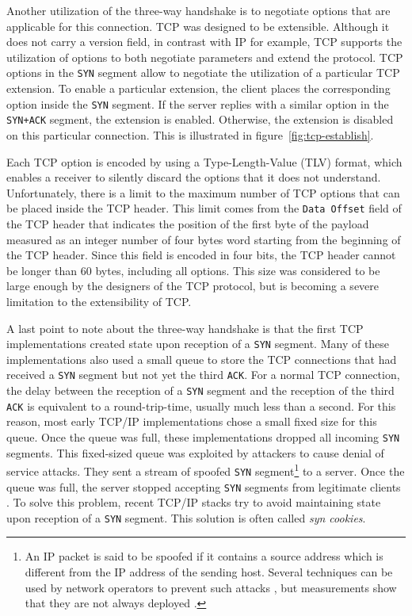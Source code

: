 Another utilization of the three-way handshake is to negotiate options that are applicable for this connection. TCP was designed to be extensible. Although it does not carry a version field, in contrast with IP for example, TCP supports the utilization of options to both negotiate parameters and extend the protocol. 
TCP options in the \texttt{SYN} segment allow to negotiate the utilization of a particular TCP extension. To enable a particular extension, the client places the corresponding option inside the \texttt{SYN} segment. If the server replies with a similar option in the \texttt{SYN+ACK} segment, the extension is enabled. Otherwise, the extension is disabled on this particular connection. This is illustrated in figure~\ref{fig:tcp-establish}.


Each TCP option is encoded by using a Type-Length-Value (TLV) format, which enables a receiver to silently discard the options that it does not understand. Unfortunately, there is a limit to the maximum number of TCP options that can be placed inside the TCP header. This limit comes from the \texttt{Data Offset} field of the TCP header that indicates the position of the first byte of the payload measured as an integer number of four bytes word starting from the beginning of the TCP header. Since this field is encoded in four bits, the TCP header cannot be longer than 60 bytes, including all options. This size was considered to be large enough by the designers of the TCP protocol, but is becoming a severe limitation to the extensibility of TCP. 

A last point to note about the three-way handshake is that the first TCP implementations created state upon reception of a \texttt{SYN} segment. Many of these implementations also used a small queue to store the TCP connections that had received a \texttt{SYN} segment but not yet the third \texttt{ACK}. For a normal TCP connection, the delay between the reception of a \texttt{SYN} segment and the reception of the third \texttt{ACK} is equivalent to a round-trip-time, usually much less than a second. For this reason, most early TCP/IP implementations chose a small fixed size for this queue. Once the queue was full, these implementations dropped all incoming \texttt{SYN} segments. This fixed-sized queue was exploited by attackers to cause denial of service attacks. They sent a stream of spoofed \texttt{SYN} segment\footnote{An IP packet is said to be spoofed if it contains a source address which is different from the IP address of the sending host. Several techniques can be used by network operators to prevent such attacks \cite{rfc2827}, but measurements show that they are not always deployed \cite{Beverly:2009:UED:1644893.1644936}.} to a server. Once the queue was full, the server stopped accepting \texttt{SYN} segments from legitimate clients \cite{rfc4987}. To solve this problem, recent TCP/IP stacks try to avoid maintaining state upon reception of a \texttt{SYN} segment. This solution is often called \emph{syn cookies}. 

